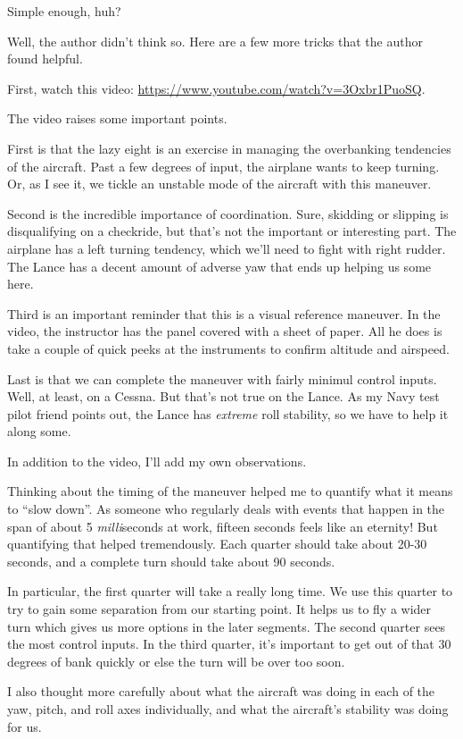 Simple enough, huh?

Well, the author didn't think so. Here are a few more tricks that the author found helpful.

First, watch this video: \url{https://www.youtube.com/watch?v=3Oxbr1PuoSQ}.

The video raises some important points.

First is that the lazy eight is an exercise in managing the overbanking tendencies of the aircraft. Past a few degrees of input, the airplane wants to keep turning. Or, as I see it, we tickle an unstable mode of the aircraft with this maneuver.

Second is the incredible importance of coordination. Sure, skidding or slipping is disqualifying on a checkride, but that's not the important or interesting part. The airplane has a left turning tendency, which we'll need to fight with right rudder. The Lance has a decent amount of adverse yaw that ends up helping us some here.

Third is an important reminder that this is a visual reference maneuver. In the video, the instructor has the panel covered with a sheet of paper. All he does is take a couple of quick peeks at the instruments to confirm altitude and airspeed.

Last is that we can complete the maneuver with fairly minimul control inputs. Well, at least, on a Cessna. But that's not true on the Lance. As my Navy test pilot friend points out, the Lance has \emph{extreme} roll stability, so we have to help it along some.

In addition to the video, I'll add my own observations.

Thinking about the timing of the maneuver helped me to quantify what it means to ``slow down''. As someone who regularly deals with events that happen in the span of about 5 \emph{milli}seconds at work, fifteen seconds feels like an eternity! But quantifying that helped tremendously. Each quarter should take about 20-30 seconds, and a complete turn should take about 90 seconds.

In particular, the first quarter will take a really long time. We use this quarter to try to gain some separation from our starting point. It helps us to fly a wider turn which gives us more options in the later segments. The second quarter sees the most control inputs. In the third quarter, it's important to get out of that 30 degrees of bank quickly or else the turn will be over too soon.

I also thought more carefully about what the aircraft was doing in each of the yaw, pitch, and roll axes individually, and what the aircraft's stability was doing for us.


